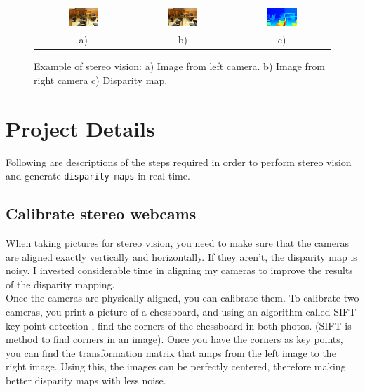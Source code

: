 \documentclass[11pt,fleqn]{article}
\begin{document}
\begin{figure}[!h]
\begin{mdframed}
\centering
\setlength{}
\begin{tabular}{ccc}
\includegraphics[width=0.33\textwidth]{images/im0-600.jpg} &
\includegraphics[width=0.33\textwidth]{images/im1-600.jpg} &
\includegraphics[width=0.33\textwidth]{images/disp-600.jpg} \\[2pt]
a) & b) & c)
\end{tabular}
\caption[Example of stereo vision]{Example of stereo vision: a) Image from left camera. b) Image from right camera c) Disparity map.}
\label{fig:example1}
\end{mdframed}
\end{figure}


\section{Project Details}

Following are descriptions of the steps required in order to perform stereo vision and generate \texttt{disparity maps} in real time.

\subsection{Calibrate stereo webcams}
When taking pictures for stereo vision, you need to make sure that the cameras are aligned exactly vertically and horizontally. If they aren't, the disparity map is noisy. I invested considerable time in aligning my cameras to improve the results of the disparity mapping.\\[5pt]
%
Once the cameras are physically aligned, you can calibrate them. To calibrate two cameras, you print a picture of a chessboard, and using an algorithm called SIFT key point detection , find the corners of the chessboard in both photos. (SIFT is method to find corners in an image). Once you have the corners as key points, you can find the transformation matrix that amps from the left image to the right image. Using this, the images can be perfectly centered, therefore making better disparity maps with less noise.
\end{document}
